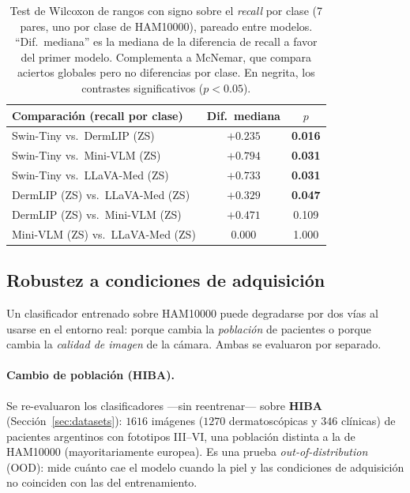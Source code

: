 \documentclass[11pt, a4paper]{article}
\begin{document}
\begin{table}[H]
  \centering
  \caption{Test de Wilcoxon de rangos con signo sobre el \emph{recall} por clase (7 pares, uno por clase de
  HAM10000), pareado entre modelos. ``Dif.\ mediana'' es la mediana de la diferencia de recall a favor del
  primer modelo. Complementa a McNemar, que compara aciertos globales pero no diferencias por clase.
  En negrita, los contrastes significativos ($p<0.05$).}
  \label{tab:wilcoxon}
  \begin{tabular}{lcc}
    \toprule
    \textbf{Comparación (recall por clase)} & \textbf{Dif.\ mediana} & \textbf{$p$} \\
    \midrule
    Swin-Tiny vs.\ DermLIP (ZS)       & $+0.235$ & \textbf{0.016} \\
    Swin-Tiny vs.\ Mini-VLM (ZS)      & $+0.794$ & \textbf{0.031} \\
    Swin-Tiny vs.\ LLaVA-Med (ZS)     & $+0.733$ & \textbf{0.031} \\
    DermLIP (ZS) vs.\ LLaVA-Med (ZS)  & $+0.329$ & \textbf{0.047} \\
    DermLIP (ZS) vs.\ Mini-VLM (ZS)   & $+0.471$ & 0.109 \\
    Mini-VLM (ZS) vs.\ LLaVA-Med (ZS) & $0.000$  & 1.000 \\
    \bottomrule
  \end{tabular}
\end{table}

\subsection{Robustez a condiciones de adquisición}
\label{sec:robustez}
Un clasificador entrenado sobre HAM10000 puede degradarse por dos vías al usarse en el entorno real:
porque cambia la \emph{población} de pacientes o porque cambia la \emph{calidad de imagen} de la cámara.
Ambas se evaluaron por separado.

\paragraph{Cambio de población (HIBA).} Se re-evaluaron los clasificadores —sin reentrenar— sobre
\textbf{HIBA} (Sección~\ref{sec:datasets}): $1616$ imágenes ($1270$ dermatoscópicas y $346$ clínicas) de pacientes argentinos con
fototipos III--VI, una población distinta a la de HAM10000 (mayoritariamente europea). Es una prueba
\emph{out-of-distribution} (OOD): mide cuánto cae el modelo cuando la piel y las condiciones de
adquisición no coinciden con las del entrenamiento.
\end{document}
